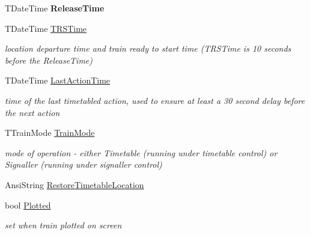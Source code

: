 \begin{DoxyCompactItemize}
\mbox{\label{class_t_train_a284962532ed0464d56031f46bae2354a}} 
T\+Date\+Time {\bfseries Release\+Time}
\item 
\mbox{\label{class_t_train_a7d04648c56b58359d476792c22800657}} 
T\+Date\+Time \mbox{\hyperlink{class_t_train_a7d04648c56b58359d476792c22800657}{T\+R\+S\+Time}}
\begin{DoxyCompactList}\small\item\em location departure time and \textquotesingle{}train ready to start\textquotesingle{} time (T\+R\+S\+Time is 10 seconds before the Release\+Time) \end{DoxyCompactList}\item 
\mbox{\label{class_t_train_a1887a95dd5762926ac67d244dd471e45}} 
T\+Date\+Time \mbox{\hyperlink{class_t_train_a1887a95dd5762926ac67d244dd471e45}{Last\+Action\+Time}}
\begin{DoxyCompactList}\small\item\em time of the last timetabled action, used to ensure at least a 30 second delay before the next action \end{DoxyCompactList}\item 
\mbox{\label{class_t_train_a860f87857baefc44a4928311698055a8}} 
T\+Train\+Mode \mbox{\hyperlink{class_t_train_a860f87857baefc44a4928311698055a8}{Train\+Mode}}
\begin{DoxyCompactList}\small\item\em mode of operation -\/ either Timetable (running under timetable control) or Signaller (running under signaller control) \end{DoxyCompactList}\item 
Ansi\+String \mbox{\hyperlink{class_t_train_a2fe228470644e5b9bcc95b3e75f9bf36}{Restore\+Timetable\+Location}}
\item 
\mbox{\label{class_t_train_ae95ef74597b4ef92b9250699e25ef58a}} 
bool \mbox{\hyperlink{class_t_train_ae95ef74597b4ef92b9250699e25ef58a}{Plotted}}
\begin{DoxyCompactList}\small\item\em set when train plotted on screen \end{DoxyCompactList}\item 
\mbox{\label{class_t_train_a3ecf54f0385bc6157ebe5f56512caf1f}} 

\end{DoxyCompactItemize}
